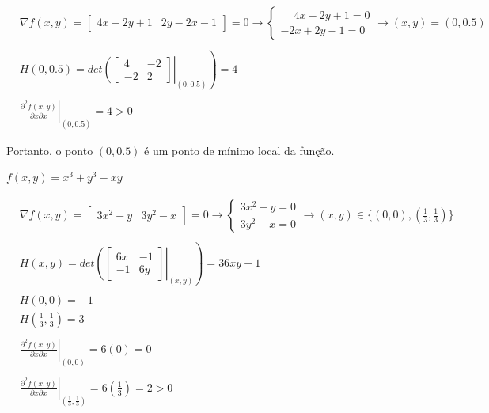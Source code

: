 \documentclass[
  letterpaper,
  DIV=11,
  numbers=noendperiod]{scrreprt}
\begin{document}
\[
  \begin{aligned}
  & \nabla f(x,y)=
  \begin{bmatrix} 4x-2y+1 & 2y-2x-1\end{bmatrix}=0 \rightarrow 
  \begin{cases} \phantom{-}4x-2y+1=0 \\ -2x+2y-1 = 0 \end{cases} \rightarrow 
  (x,y) = (0, 0.5) & \\ \\
  &  H(0, 0.5) = 
  \left. det \left( \begin{bmatrix} 4 & -2 \\ 
                  -2 & 2 \end{bmatrix}
  \right |_{(0, 0.5)} \right ) = 4 & \\ \\
  &\left. \frac{\partial^2 f(x,y)}{\partial x \partial x} \right|_{(0, 0.5)}=
  4>0
  & \end{aligned}
  \]

Portanto, o ponto \((0, 0.5)\) é um ponto de mínimo local da função.

\(f(x,y)=x^3 + y^3 − xy\)

\[
  \begin{aligned}
  & \nabla f(x,y)=
  \begin{bmatrix} 3x^2-y & 3y^2-x \end{bmatrix}=0 \rightarrow 
  \begin{cases} 3x^2-y = 0 \\ 3y^2-x = 0 \end{cases} \rightarrow 
  (x,y) \in \{(0, 0), (\frac{1}{3},\frac{1}{3})\}& \\ \\
  &  H(x,y) = 
  \left. det \left( \begin{bmatrix} 6x & -1 \\ 
                  -1 & 6y \end{bmatrix}
  \right |_{(x,y)} \right ) = 36xy-1 & \\ \\
  & H(0,0) = -1  &\\ 
  & H(\frac{1}{3},\frac{1}{3}) = 3  &\\ \\
  &\left. \frac{\partial^2 f(x,y)}{\partial x \partial x} \right|_{(0,0)}=
  6(0)=0 &\\ \\
  &\left. \frac{\partial^2 f(x,y)}{\partial x \partial x} \right|_{(\frac{1}{3},\frac{1}{3})}=
  6(\frac{1}{3})=2>0
& \end{aligned}
\]
\end{document}
